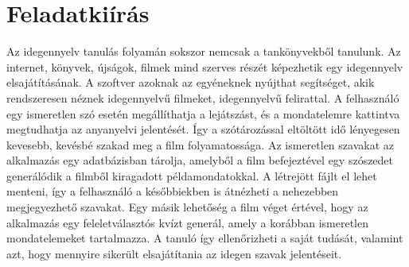 \chapter*{Feladatkiírás}


Az idegennyelv tanulás folyamán sokszor nemcsak a tankönyvekből tanulunk. Az internet, könyvek, újságok, filmek mind szerves részét képezhetik egy idegennyelv elsajátításának. A szoftver azoknak az egyéneknek nyújthat segítséget, akik rendszeresen néznek idegennyelvű filmeket, idegennyelvű felirattal. A felhasználó egy ismeretlen szó esetén megállíthatja a lejátszást, és a mondatelemre kattintva megtudhatja az anyanyelvi jelentését. Így a szótározással eltöltött idő lényegesen kevesebb, kevésbé szakad meg a film folyamatossága.
Az ismeretlen szavakat az alkalmazás egy adatbázisban tárolja, amelyből a film befejeztével egy szószedet generálódik a filmből kiragadott példamondatokkal. A létrejött fájlt el lehet menteni, így a felhasználó a későbbiekben is átnézheti a nehezebben megjegyezhető szavakat.
Egy másik lehetőség a film véget értével, hogy az alkalmazás egy feleletválasztós kvízt generál, amely a korábban ismeretlen mondatelemeket tartalmazza. A tanuló így ellenőrizheti a saját tudását, valamint azt, hogy mennyire sikerült elsajátítania az idegen szavak jelentéseit.

